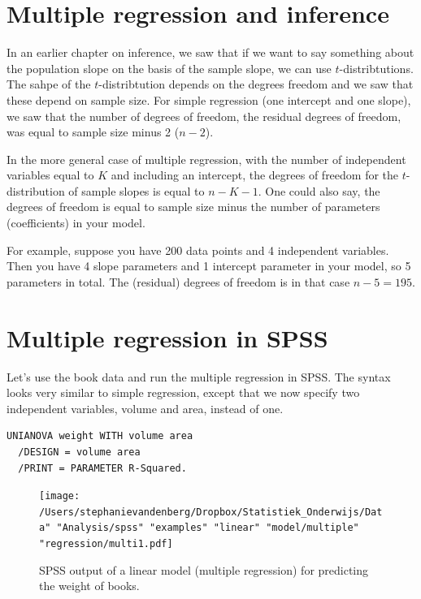 \documentclass[]{book}\usepackage[]{graphicx}\usepackage[]{color}
\begin{document}
\section{Multiple regression and inference}

In an earlier chapter on inference, we saw that if we want to say something about the population slope on the basis of the sample slope, we can use $t$-distribtutions. The sahpe of the $t$-distribtution depends on the degrees freedom and we saw that these depend on sample size. For simple regression (one intercept and one slope), we saw that the number of degrees of freedom, the residual degrees of freedom, was equal to sample size minus 2 ($n-2$).

In the more general case of multiple regression, with the number of independent variables equal to $K$ and including an intercept, the degrees of freedom for the $t$-distribution of sample slopes is equal to $n-K-1$. One could also say, the degrees of freedom is equal to sample size minus the number of parameters (coefficients) in your model.

For example, suppose you have 200 data points and 4 independent variables. Then you have 4 slope parameters and 1 intercept parameter in your model, so 5 parameters in total. The (residual) degrees of freedom is in that case $n-5=195$.




\section{Multiple regression in SPSS}

Let's use the book data and run the multiple regression in SPSS. The syntax looks very similar to simple regression, except that we now specify two independent variables, volume and area, instead of one.

\begin{verbatim}
UNIANOVA weight WITH volume area
  /DESIGN = volume area
  /PRINT = PARAMETER R-Squared.
\end{verbatim}


\begin{figure}[h]
    \begin{center}
       \texttt{[image: /Users/stephanievandenberg/Dropbox/Statistiek\_Onderwijs/Data" "Analysis/spss" "examples" "linear" "model/multiple" "regression/multi1.pdf]}
    \end{center}
     \caption{SPSS output of a linear model (multiple regression) for predicting the weight of books.}
    \label{fig:multi1}
\end{figure}
\end{document}
